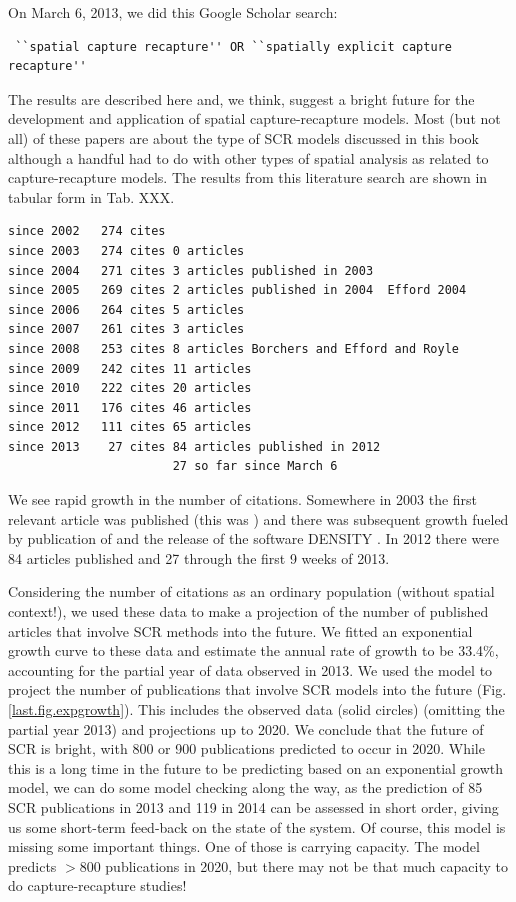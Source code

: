 On March 6, 2013, 
we did this Google Scholar search:
\begin{verbatim}
 ``spatial capture recapture'' OR ``spatially explicit capture recapture''
\end{verbatim}
The results are described here and, we think, suggest a bright future
for the development and application of spatial capture-recapture
models.  Most (but not all) of these papers are about the type of SCR models
discussed in this book although a handful had to
do with other types of spatial analysis as related to
capture-recapture models.
The results from this literature search are shown
in tabular form in Tab. XXX. 
\begin{verbatim}
since 2002   274 cites
since 2003   274 cites 0 articles
since 2004   271 cites 3 articles published in 2003
since 2005   269 cites 2 articles published in 2004  Efford 2004
since 2006   264 cites 5 articles
since 2007   261 cites 3 articles
since 2008   253 cites 8 articles Borchers and Efford and Royle 
since 2009   242 cites 11 articles
since 2010   222 cites 20 articles
since 2011   176 cites 46 articles
since 2012   111 cites 65 articles
since 2013    27 cites 84 articles published in 2012
                       27 so far since March 6
\end{verbatim}

We see rapid growth in the number of citations. Somewhere in 2003 the
first relevant article was published (this was \citet{parmenter_etal:2003})
and there was subsequent growth fueled by publication of
\citet{efford:2004} and the release of the software DENSITY
\citep{efford_etal:2004}. In 2012 there were 84 articles published and
27 through the first 9 weeks of 2013.

Considering the number of citations as an ordinary population (without
spatial context!), we used these data to make a projection of the
number of published articles that involve SCR methods into the future.
We fitted an exponential growth curve to these data and estimate the
annual rate of growth to be 33.4\%, accounting for the partial year of
data observed in 2013.  We used the model to project the number of
publications that involve SCR models into the future
(Fig. \ref{last.fig.expgrowth}). This includes the observed data
(solid circles) (omitting the partial year 2013) and projections up to
2020.  We conclude that the future of SCR is bright, with 800 or 900
publications predicted to occur in 2020. While this is a long time in
the future to be predicting based on an exponential growth model, we
can do some model checking along the way, as the prediction of 85 SCR
publications in 2013 and 119 in 2014 can be assessed in short order,
giving us some short-term feed-back on the state of the system.  Of
course, this model is missing some important things. One of those is
carrying capacity. The model predicts $>800$ publications in 2020, but
there may not be that much capacity to do capture-recapture studies!




